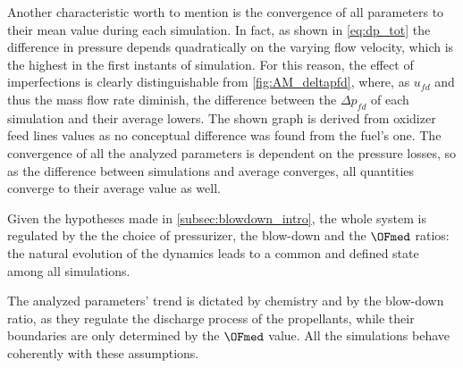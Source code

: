 
Another characteristic worth to mention is the convergence of all parameters to their mean value during each simulation.
In fact, as shown in \autoref{eq:dp_tot} the difference in pressure depends quadratically on the varying flow velocity, which is the highest in the first instants of simulation.
For this reason, the effect of imperfections is clearly distinguishable from \autoref{fig:AM_deltapfd}, where, as $u_{fd}$ and thus the mass flow rate diminish, the difference between the $\Delta p_{fd}$ of each simulation and their average lowers. The shown graph is derived from oxidizer feed lines values as no conceptual difference was found from the fuel's one. The convergence of all the analyzed parameters is dependent on the pressure losses, so as the difference between simulations and average converges, all quantities converge to their average value as well.

Given the hypotheses made in \autoref{subsec:blowdown_intro}, the whole system is regulated by the the choice of pressurizer, the blow-down and the $\OFmed$ ratios: the natural evolution of the dynamics leads to a common and defined state among all simulations.

The analyzed parameters' trend is dictated by chemistry and by the blow-down ratio, as they regulate the discharge process of the propellants, while their boundaries are only determined by the $\OFmed$ value. All the simulations behave coherently  with these assumptions. 











